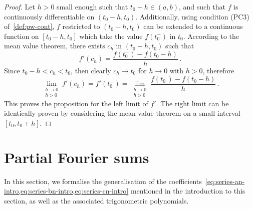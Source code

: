 \begin{proof}
  Let $h>0$ small enough such that $t_0-h\in(a,b)$, and such that $f$ is continuously
  differentiable on $(t_0-h,t_0)$. Additionally, using condition (PC3)
  of~\cref{def:pw-cont}, $f$ restricted to $(t_0-h,t_0)$ can be extended to a continuous
  function on $[t_0-h,t_0]$ which take the value $f(t_0^-)$ in $t_0$. According to the
  mean value theorem, there exists $c_h$ in $(t_0-h,t_0)$ such that
  \begin{equation}
    f'(c_h)=\frac{f(t_0^-)-f(t_0-h)}{h}\,.
  \end{equation}
  Since $t_0-h<c_h<t_0$, then clearly $c_h\to t_0$ for $h\to 0$ with $h>0$, therefore
  \begin{equation}
    \lim_{\substack{h\to0\\h>0}}f'(c_h)=f'(t_0^-)
    =\lim_{\substack{h\to0\\h>0}}\frac{f(t_0^-)-f(t_0-h)}{h}\,.
  \end{equation}
  This proves the proposition for the left limit of $f'$. The right limit can be
  identically proven by considering the mean value theorem on a small interval
  $[t_0,t_0+h]$.
\end{proof}

\section{Partial Fourier sums}
In this section, we formalise the generalisation of the
coefficients~\cref{eq:series-an-intro,eq:series-bn-intro,eq:series-cn-intro} mentioned in
the introduction to this section, as well as the associated trigonometric polynomials.
